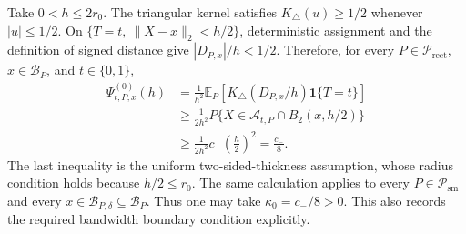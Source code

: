 Take \(0<h\leq2r_0\).  The triangular kernel satisfies \(K_\triangle(u)\geq1/2\) whenever \(|u|\leq1/2\).  On \(\{T=t,\ \lVert X-x\rVert_2<h/2\}\), deterministic assignment and the definition of signed distance give \(|D_{P,x}|/h<1/2\).  Therefore, for every \(P\in\mathcal P_{\mathrm{rect}}\), \(x\in\mathcal B_P\), and \(t\in\{0,1\}\),
\[
\begin{aligned}
\Psi^{(0)}_{t,P,x}(h)
&=\frac1{h^2}\mathbb E_P\!\left[K_\triangle(D_{P,x}/h)\mathbf1\{T=t\}\right]\\
&\geq\frac1{2h^2}P\{X\in\mathcal A_{t,P}\cap B_2(x,h/2)\}\\
&\geq\frac1{2h^2}c_-\left(\frac h2\right)^2
=\frac{c_-}{8}.
\end{aligned}
\]
The last inequality is the uniform two-sided-thickness assumption, whose radius condition holds because \(h/2\leq r_0\).  The same calculation applies to every \(P\in\mathcal P_{\mathrm{sm}}\) and every \(x\in\mathcal B_{P,\delta}\subseteq\mathcal B_P\).  Thus one may take \(\kappa_0=c_-/8>0\).  This also records the required bandwidth boundary condition explicitly.